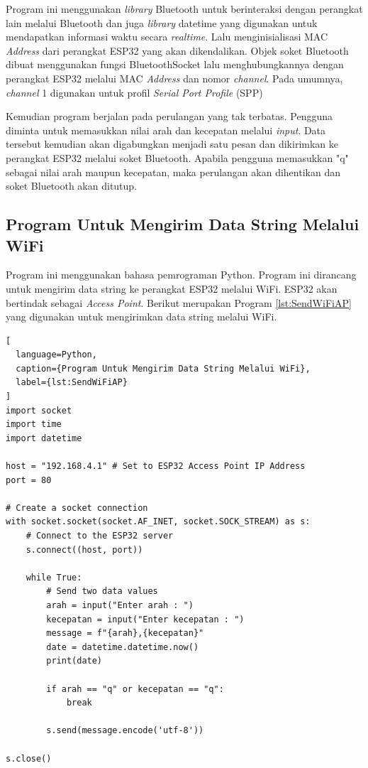 Program ini menggunakan \emph{library} Bluetooth untuk berinteraksi dengan perangkat lain melalui Bluetooth dan juga \emph{library} datetime yang digunakan untuk mendapatkan informasi waktu secara \emph{realtime}. Lalu menginisialisasi MAC \emph{Address} dari perangkat ESP32 yang akan dikendalikan. Objek soket Bluetooth dibuat menggunakan fungsi BluetoothSocket lalu menghubungkannya dengan perangkat ESP32 melalui MAC \emph{Address} dan nomor \emph{channel}. Pada umumnya, \emph{channel} 1 digunakan untuk profil \emph{Serial Port Profile} (SPP)

Kemudian program berjalan pada perulangan yang tak terbatas. Pengguna diminta untuk memasukkan nilai arah dan kecepatan melalui \emph{input}. Data tersebut kemudian akan digabungkan menjadi satu pesan dan dikirimkan ke perangkat ESP32 melalui soket Bluetooth. Apabila pengguna memasukkan "q" sebagai nilai arah maupun kecepatan, maka perulangan akan dihentikan dan soket Bluetooth akan ditutup.

\subsection{Program Untuk Mengirim Data String Melalui WiFi}

Program ini menggunakan bahasa pemrograman Python. Program ini dirancang untuk mengirim data string ke perangkat ESP32 melalui WiFi. ESP32 akan bertindak sebagai \emph{Access Point}. Berikut merupakan Program \ref{lst:SendWiFiAP} yang digunakan untuk mengirimkan data string melalui WiFi.

\begin{lstlisting}[
  language=Python,
  caption={Program Untuk Mengirim Data String Melalui WiFi},
  label={lst:SendWiFiAP}
]
import socket
import time
import datetime

host = "192.168.4.1" # Set to ESP32 Access Point IP Address
port = 80

# Create a socket connection
with socket.socket(socket.AF_INET, socket.SOCK_STREAM) as s:
    # Connect to the ESP32 server
    s.connect((host, port))
    
    while True:
        # Send two data values
        arah = input("Enter arah : ")
        kecepatan = input("Enter kecepatan : ")
        message = f"{arah},{kecepatan}"
        date = datetime.datetime.now()
        print(date)
    
        if arah == "q" or kecepatan == "q":
            break
    
        s.send(message.encode('utf-8'))
        
s.close()

\end{lstlisting}

